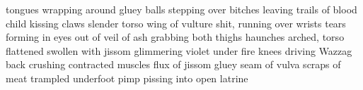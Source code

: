 tongues wrapping around gluey balls
stepping over bitches 
leaving trails of blood
child kissing claws
slender torso
wing of vulture
shit, running over wrists
tears forming in eyes
out of veil of ash
grabbing both thighs
haunches arched, torso flattened
swollen with jissom
glimmering violet under fire
knees driving Wazzag back
crushing contracted muscles
flux of jissom
gluey seam of vulva
scraps of meat trampled underfoot
pimp pissing into open latrine
